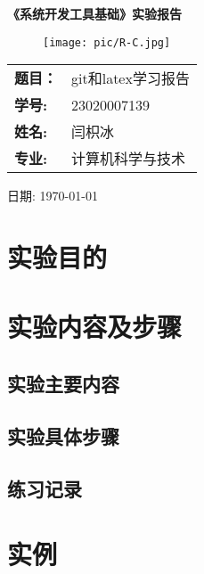\documentclass[a4paper]{article}
\begin{document}
 

\begin{titlepage}  
    \centering  
    \huge \textbf{《系统开发工具基础》实验报告} \\  
    \vspace{5cm}  
    
     \begin{figure}[ht]
    \centering
    \texttt{[image: pic/R-C.jpg]}
\end{figure}
    \Large  
    \vspace{3cm} 
 
    \begin{tabular}{ll} 
        \textbf{题目：}&git和latex学习报告\\
        \cline{2-2} 
        \textbf{学号:} & 23020007139 \\ 
       \cline{2-2} 
        \textbf{姓名:} & 闫枳冰 \\  
        \cline{2-2} 
        \textbf{专业:} & 计算机科学与技术 \\  
       \cline{2-2} 
    \end{tabular}  
    \vspace{2cm}  
 
    \Large 日期: \today  
    
\end{titlepage}  

\tableofcontents
\newpage
{}
\section{实验目的}  

\section{实验内容及步骤}

\subsection{实验主要内容}
\subsection{实验具体步骤}
\subsection{练习记录}
\section{实例}
\end{document}
